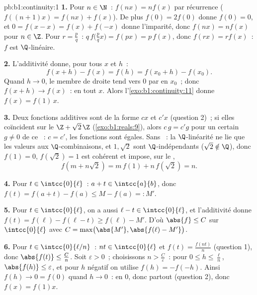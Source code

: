 \begin{solution}{pb:b1:continuity:1}
\textbf{1.} Pour $n \in \N$~: $f(nx) = n f(x)$ par récurrence
($f((n+1)x) = f(nx) + f(x)$). De plus $f(0) = 2f(0)$ donne $f(0) =
0$, et $0 = f(x - x) = f(x) + f(-x)$ donne l'imparité, donc $f(nx) =
nf(x)$ pour $n \in \Z$. Pour $r = \frac pq$~: $q\,f\bigl(\tfrac
pq x\bigr) = f(px) = p\,f(x)$, donc $f(rx) = r f(x)$~: $f$ est
$\Q$-linéaire.

\textbf{2.} L'additivité donne, pour tous $x$ et $h$~:
\[
f(x + h) - f(x) = f(h) = f(x_0 + h) - f(x_0) .
\]
Quand $h \to 0$, le membre de droite tend vers $0$ par  en
$x_0$~; donc $f(x + h) \to f(x)$~:  en tout $x$. Alors
l'\cref{exo:b1:continuity:11} donne $f(x) = f(1)\,x$.

\textbf{3.} Deux fonctions additives  sont de la forme
$cx$ et $c'x$ (question 2)~; si elles coïncident sur le 
 $\Z + \sqrt2\,\Z$ (\cref{exo:b1:reals:9}), alors $c\,g = c'g$
pour un certain $g \neq 0$ de ce ~: $c = c'$, les fonctions
sont égales. Sans ~: la $\Q$-linéarité ne lie que les valeurs
aux $\Q$-combinaisons, et $1, \sqrt2$ sont $\Q$-indépendants ($\sqrt2
\notin \Q$), donc $f(1) = 0$, $f(\sqrt2) = 1$ est cohérent et impose,
sur le ,
\[
f(m + n\sqrt2) = m\,f(1) + n\,f(\sqrt2) = n .
\]

\textbf{4.} Pour $t \in \intcc{0}{\ell}$~: $a + t \in
\intcc{a}{b}$, donc $f(t) = f(a + t) - f(a) \leq M - f(a) =: M'$.

\textbf{5.} Pour $t \in \intcc{0}{\ell}$, on a aussi $\ell - t \in
\intcc{0}{\ell}$, et l'additivité donne $f(t) = f(\ell) - f(\ell
- t) \geq f(\ell) - M'$. D'où $\abs{f} \leq C$ sur
$\intcc{0}{\ell}$ avec $C = \max\bigl(\abs{M'}, \abs{f(\ell) -
M'}\bigr)$.

\textbf{6.} Pour $t \in \intcc{0}{\ell/n}$~: $nt \in
\intcc{0}{\ell}$ et $f(t) = \frac{f(nt)}{n}$ (question 1), donc
$\abs{f(t)} \leq \frac Cn$. Soit $\varepsilon > 0$~; choisissons $n >
\frac C\varepsilon$~: pour $0 \leq h \leq \frac\ell n$,
$\abs{f(h)} \leq \varepsilon$, et pour $h$ négatif on utilise $f(h) =
-f(-h)$. Ainsi $f(h) \to 0 = f(0)$ quand $h \to 0$~:  en $0$,
donc partout (question 2), donc $f(x) = f(1)x$.


\end{solution}
